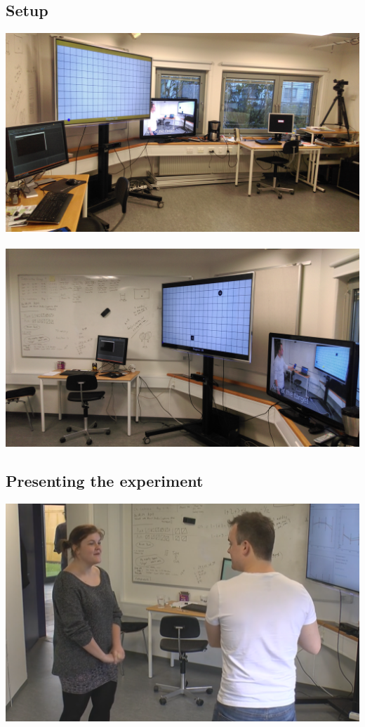 \subsection*{\pictures}

\subsection*{Setup}
\includegraphics[width=\textwidth]{docs/appendix/files/setup_left.jpg}
\\\\
\includegraphics[width=\textwidth]{docs/appendix/files/setup_right.jpg}

\subsection*{Presenting the experiment}
\includegraphics[width=\textwidth]{docs/appendix/files/introduction.png}
